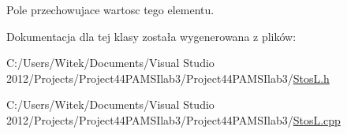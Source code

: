Pole przechowujace wartosc tego elementu. 



Dokumentacja dla tej klasy została wygenerowana z plików\-:\begin{DoxyCompactItemize}
\item 
C\-:/\-Users/\-Witek/\-Documents/\-Visual Studio 2012/\-Projects/\-Project44\-P\-A\-M\-S\-Ilab3/\-Project44\-P\-A\-M\-S\-Ilab3/\hyperlink{_stos_l_8h}{Stos\-L.\-h}\item 
C\-:/\-Users/\-Witek/\-Documents/\-Visual Studio 2012/\-Projects/\-Project44\-P\-A\-M\-S\-Ilab3/\-Project44\-P\-A\-M\-S\-Ilab3/\hyperlink{_stos_l_8cpp}{Stos\-L.\-cpp}\end{DoxyCompactItemize}

